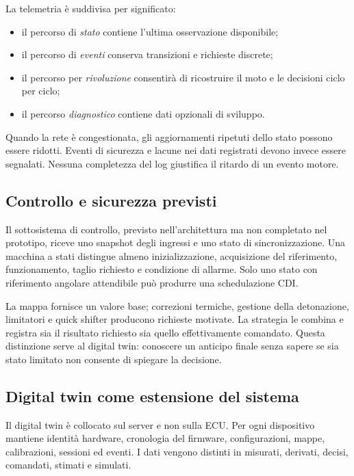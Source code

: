 \documentclass{article}
\begin{document}
La telemetria è suddivisa per significato:

\begin{itemize}
    \item il percorso di \emph{stato} contiene l'ultima osservazione disponibile;
    \item il percorso di \emph{eventi} conserva transizioni e richieste discrete;
    \item il percorso per \emph{rivoluzione} consentirà di ricostruire il moto e
          le decisioni ciclo per ciclo;
    \item il percorso \emph{diagnostico} contiene dati opzionali di sviluppo.
\end{itemize}

Quando la rete è congestionata, gli aggiornamenti ripetuti dello stato possono
essere ridotti. Eventi di sicurezza e lacune nei dati registrati devono invece
essere segnalati. Nessuna completezza del log giustifica il ritardo di un evento
motore.

\subsection{Controllo e sicurezza previsti}

Il sottosistema di controllo, previsto nell'architettura ma non completato nel
prototipo, riceve uno snapshot degli ingressi e uno stato di sincronizzazione.
Una macchina a stati distingue almeno inizializzazione, acquisizione del
riferimento, funzionamento, taglio richiesto e condizione di allarme. Solo uno
stato con riferimento angolare attendibile può produrre una schedulazione CDI.

La mappa fornisce un valore base; correzioni termiche, gestione della
detonazione, limitatori e quick shifter producono richieste motivate. La
strategia le combina e registra sia il risultato richiesto sia quello
effettivamente comandato. Questa distinzione serve al digital twin: conoscere
un anticipo finale senza sapere se sia stato limitato non consente di spiegare
la decisione.

\subsection{Digital twin come estensione del sistema}

Il digital twin è collocato sul server e non sulla ECU. Per ogni dispositivo
mantiene identità hardware, cronologia del firmware, configurazioni, mappe,
calibrazioni, sessioni ed eventi. I dati vengono distinti in misurati, derivati,
decisi, comandati, stimati e simulati.
\end{document}

